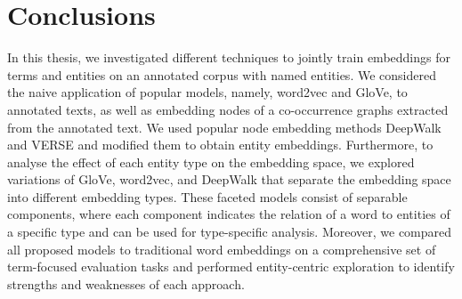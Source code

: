 \chapter{Conclusions}\label{chap:concl}
In this thesis, we investigated different techniques to jointly train embeddings for terms and entities on an annotated corpus with named entities. We considered the naive application of popular models, namely, word2vec and GloVe, to annotated texts, as well as embedding nodes of a co-occurrence graphs extracted from the annotated text. We used popular node embedding methods DeepWalk and VERSE and modified them to obtain entity embeddings. Furthermore, to analyse the effect of each entity type on the embedding space, we explored variations of GloVe, word2vec, and DeepWalk that separate the embedding space into different embedding types. These faceted models consist of separable components, where each component indicates the relation of a word to entities of a specific type and can be used for type-specific analysis. Moreover, we compared all proposed models to traditional word embeddings on a comprehensive set of term-focused evaluation tasks and performed entity-centric exploration to identify strengths and weaknesses of each approach. 

